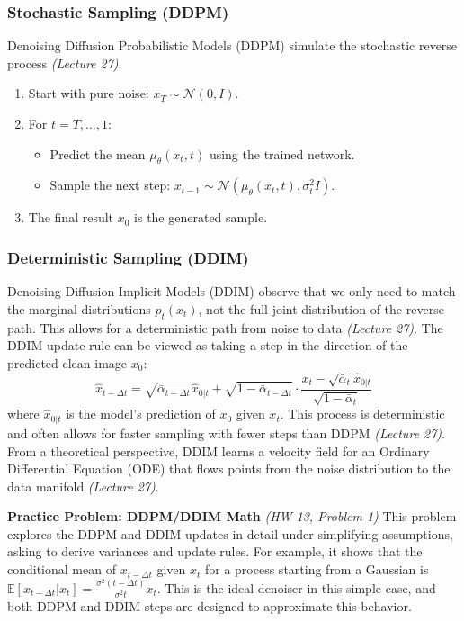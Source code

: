 \documentclass[11pt]{article}
\begin{document}
\subsubsection{Stochastic Sampling (DDPM)}
Denoising Diffusion Probabilistic Models (DDPM) simulate the stochastic reverse process \textit{(Lecture 27)}.
\begin{enumerate}
    \item Start with pure noise: $x_T \sim \mathcal{N}(0, I)$.
    \item For $t = T, \dots, 1$:
    \begin{itemize}
        \item Predict the mean $\mu_\theta(x_t, t)$ using the trained network.
        \item Sample the next step: $x_{t-1} \sim \mathcal{N}(\mu_\theta(x_t, t), \sigma_t^2 I)$.
    \end{itemize}
    \item The final result $x_0$ is the generated sample.
\end{enumerate}

\subsubsection{Deterministic Sampling (DDIM)}
Denoising Diffusion Implicit Models (DDIM) observe that we only need to match the marginal distributions $p_t(x_t)$, not the full joint distribution of the reverse path. This allows for a deterministic path from noise to data \textit{(Lecture 27)}. The DDIM update rule can be viewed as taking a step in the direction of the predicted clean image $x_0$:
\[ \hat{x}_{t-\Delta t} = \sqrt{\bar{\alpha}_{t-\Delta t}} \hat{x}_{0|t} + \sqrt{1 - \bar{\alpha}_{t-\Delta t}} \cdot \frac{x_t - \sqrt{\bar{\alpha}_t} \hat{x}_{0|t}}{\sqrt{1-\bar{\alpha}_t}} \]
where $\hat{x}_{0|t}$ is the model's prediction of $x_0$ given $x_t$. This process is deterministic and often allows for faster sampling with fewer steps than DDPM \textit{(Lecture 27)}. From a theoretical perspective, DDIM learns a velocity field for an Ordinary Differential Equation (ODE) that flows points from the noise distribution to the data manifold \textit{(Lecture 27)}.

\textbf{Practice Problem: DDPM/DDIM Math} \textit{(HW 13, Problem 1)}
This problem explores the DDPM and DDIM updates in detail under simplifying assumptions, asking to derive variances and update rules. For example, it shows that the conditional mean of $x_{t-\Delta t}$ given $x_t$ for a process starting from a Gaussian is $\mathbb{E}[x_{t-\Delta t} | x_t] = \frac{\sigma^2(t-\Delta t)}{\sigma^2 t} x_t$. This is the ideal denoiser in this simple case, and both DDPM and DDIM steps are designed to approximate this behavior.
\end{document}

